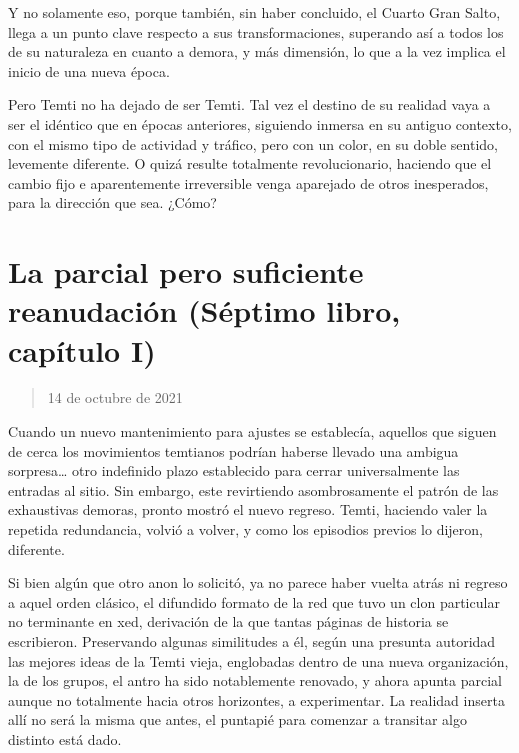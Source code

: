 \documentclass[
]{book}
\begin{document}
Y no solamente eso, porque también, sin haber concluido, el Cuarto Gran Salto, llega a un punto clave respecto a sus transformaciones, superando así a todos los de su naturaleza en cuanto a demora, y más dimensión, lo que a la vez implica el inicio de una nueva época.

Pero Temti no ha dejado de ser Temti. Tal vez el destino de su realidad vaya a ser el idéntico que en épocas anteriores, siguiendo inmersa en su antiguo contexto, con el mismo tipo de actividad y tráfico, pero con un color, en su doble sentido, levemente diferente. O quizá resulte totalmente revolucionario, haciendo que el cambio fijo e aparentemente irreversible venga aparejado de otros inesperados, para la dirección que sea. ¿Cómo?

\hypertarget{la-parcial-pero-suficiente-reanudaciuxf3n-suxe9ptimo-libro-capuxedtulo-i}{%
\section{La parcial pero suficiente reanudación (Séptimo libro, capítulo I)}\label{la-parcial-pero-suficiente-reanudaciuxf3n-suxe9ptimo-libro-capuxedtulo-i}}

\begin{quote}
14 de octubre de 2021
\end{quote}

Cuando un nuevo mantenimiento para ajustes se establecía, aquellos que siguen de cerca los movimientos temtianos podrían haberse llevado una ambigua sorpresa\ldots{} otro indefinido plazo establecido para cerrar universalmente las entradas al sitio. Sin embargo, este revirtiendo asombrosamente el patrón de las exhaustivas demoras, pronto mostró el nuevo regreso. Temti, haciendo valer la repetida redundancia, volvió a volver, y como los episodios previos lo dijeron, diferente.

Si bien algún que otro anon lo solicitó, ya no parece haber vuelta atrás ni regreso a aquel orden clásico, el difundido formato de la red que tuvo un clon particular no terminante en xed, derivación de la que tantas páginas de historia se escribieron. Preservando algunas similitudes a él, según una presunta autoridad las mejores ideas de la Temti vieja, englobadas dentro de una nueva organización, la de los grupos, el antro ha sido notablemente renovado, y ahora apunta parcial aunque no totalmente hacia otros horizontes, a experimentar. La realidad inserta allí no será la misma que antes, el puntapié para comenzar a transitar algo distinto está dado.
\end{document}
